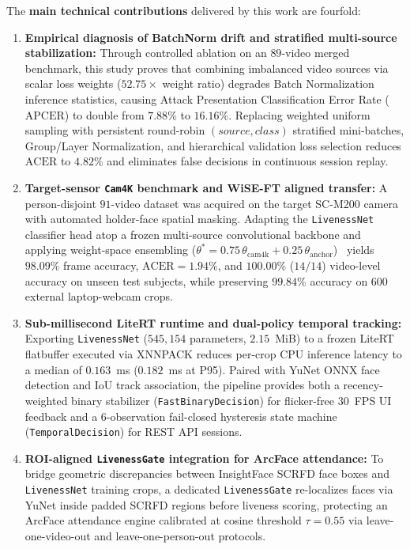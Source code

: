 The \textbf{main technical contributions} delivered by this work are fourfold:
\begin{enumerate}
    \item \textbf{Empirical diagnosis of BatchNorm drift and stratified multi-source stabilization:} Through controlled ablation on an $89$-video merged benchmark, this study proves that combining imbalanced video sources via scalar loss weights ($52.75\times$ weight ratio) degrades Batch Normalization inference statistics, causing Attack Presentation Classification Error Rate ($\text{APCER}$) to double from $7.88\%$ to $16.16\%$. Replacing weighted uniform sampling with persistent round-robin $(source, class)$ stratified mini-batches, Group/Layer Normalization, and hierarchical validation loss selection reduces $\text{ACER}$ to $4.82\%$ and eliminates false decisions in continuous session replay.
    \item \textbf{Target-sensor \texttt{Cam4K} benchmark and WiSE-FT aligned transfer:} A person-disjoint $91$-video dataset was acquired on the target SC-M200 camera with automated holder-face spatial masking. Adapting the \texttt{LivenessNet} classifier head atop a frozen multi-source convolutional backbone and applying weight-space ensembling ($\theta^* = 0.75\,\theta_{\text{cam4k}} + 0.25\,\theta_{\text{anchor}}$)~\cite{wortsman2022robust} yields $98.09\%$ frame accuracy, $\text{ACER} = 1.94\%$, and $100.00\%$ ($14/14$) video-level accuracy on unseen test subjects, while preserving $99.84\%$ accuracy on $600$ external laptop-webcam crops.
    \item \textbf{Sub-millisecond LiteRT runtime and dual-policy temporal tracking:} Exporting \texttt{LivenessNet} ($545{,}154$ parameters, $2.15$~MiB) to a frozen LiteRT flatbuffer executed via XNNPACK reduces per-crop CPU inference latency to a median of $0.163$~ms ($0.182$~ms at P95). Paired with YuNet ONNX face detection and IoU track association, the pipeline provides both a recency-weighted binary stabilizer (\texttt{FastBinaryDecision}) for flicker-free $30$~FPS UI feedback and a $6$-observation fail-closed hysteresis state machine (\texttt{TemporalDecision}) for REST API sessions.
    \item \textbf{ROI-aligned \texttt{LivenessGate} integration for ArcFace attendance:} To bridge geometric discrepancies between InsightFace SCRFD face boxes and \texttt{LivenessNet} training crops, a dedicated \texttt{LivenessGate} re-localizes faces via YuNet inside padded SCRFD regions before liveness scoring, protecting an ArcFace attendance engine calibrated at cosine threshold $\tau = 0.55$ via leave-one-video-out and leave-one-person-out protocols.
\end{enumerate}

